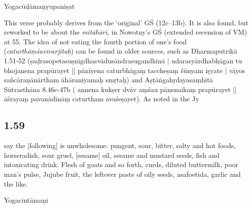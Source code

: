 \begin{ekdosis}
\begin{testimonia}[hp01_058]
Yogacūḍāmaṇyupaniṣat

\begin{versinnote}
\end{versinnote}

\end{testimonia}

\begin{philcomm}[hp01_058]
This verse probably derives from the ‘original’ GŚ (12c–13b). It is also found, but reworked to be about the \emph{mitāhārī}, in Nowotny’s GŚ (extended recension of VM) at 55. The idea of not eating the fourth portion of one’s food (\emph{caturthāṃśavivarjitaḥ}) can be found in older sources, such as Dharmaputrikā 1.51-52 (ṣaḍrasopetasuṣnigdhasvādusāndrasugandhinā |
udarasyārdhabhāgan tu bhojanena prapūrayet || pānīyena caturbhāgaṃ taccheṣaṃ śūnyam iṣyate | vāyos sañcāraṇānārtham āhāraniyamaḥ smṛtaḥ) and Aṣṭāṅgahṛdayasaṃhitā Sūtrasthāna 8.46c-47b ( annena kukṣer dvāv aṃśau pānenaikaṃ prapūrayet ||āśrayaṃ pavanādīnāṃ caturtham avaśeṣayet). As noted in the Jy

\end{philcomm}

\subsection*{1.59}
\begin{translation}[hp01_059]
[Adepts] say the [following] is unwholesome: pungent, sour, bitter, salty and hot foods, horseradish, sour gruel, [sesame] oil, sesame and mustard seeds, fish and intoxicating drink. Flesh of goats and so forth, curds, diluted buttermilk, poor man's pulse, Jujube fruit, the leftover paste of oily seeds, asafoetida, garlic and the like.
\end{translation}

\begin{sources}[hp01_059]
\end{sources}

\begin{testimonia}[hp01_059]
Yogacintāmaṇi

\begin{versinnote}
\end{versinnote}


\end{testimonia}
\end{ekdosis}
